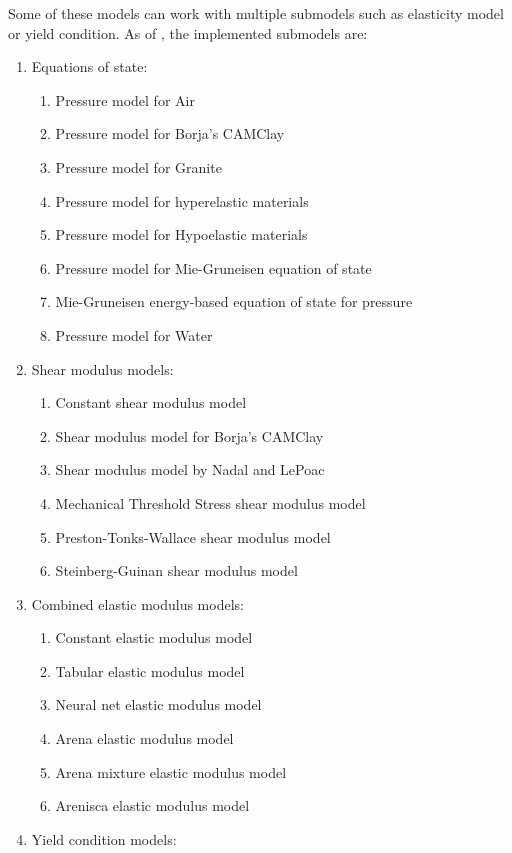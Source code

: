 Some of these models can work with multiple submodels such as elasticity model
or yield condition.  As of \Vaango \version, the implemented submodels are:
\begin{enumerate}
  \item Equations of state:
  \begin{enumerate}
    \item Pressure model for Air
    \item Pressure model for Borja's CAMClay
    \item Pressure model for Granite
    \item Pressure model for hyperelastic materials
    \item Pressure model for Hypoelastic materials
    \item Pressure model for Mie-Gruneisen equation of state
    \item Mie-Gruneisen energy-based equation of state for pressure
    \item Pressure model for Water
  \end{enumerate}
  \item Shear modulus models:
  \begin{enumerate}
    \item Constant shear modulus model
    \item Shear modulus model for Borja's CAMClay
    \item Shear modulus model by Nadal and LePoac
    \item Mechanical Threshold Stress shear modulus model
    \item Preston-Tonks-Wallace shear modulus model
    \item Steinberg-Guinan shear modulus model
  \end{enumerate}
  \item Combined elastic modulus models:
  \begin{enumerate}
    \item Constant elastic modulus model
    \item Tabular elastic modulus model
    \item Neural net elastic modulus model
    \item Arena elastic modulus model
    \item Arena mixture elastic modulus model
    \item Arenisca elastic modulus model
  \end{enumerate}
  \item Yield condition models:
  \begin{enumerate}

\end{enumerate}
\end{enumerate}

